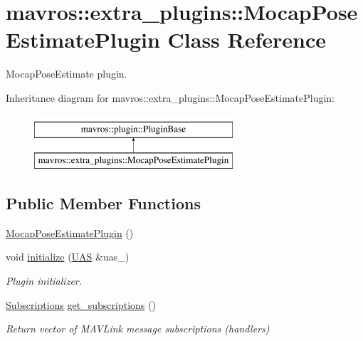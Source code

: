 \hypertarget{classmavros_1_1extra__plugins_1_1MocapPoseEstimatePlugin}{}\section{mavros\+::extra\+\_\+plugins\+::Mocap\+Pose\+Estimate\+Plugin Class Reference}
\label{classmavros_1_1extra__plugins_1_1MocapPoseEstimatePlugin}


Mocap\+Pose\+Estimate plugin.  


Inheritance diagram for mavros\+::extra\+\_\+plugins\+::Mocap\+Pose\+Estimate\+Plugin\+:\begin{figure}[H]
\begin{center}
\leavevmode
\includegraphics[height=2.000000cm]{classmavros_1_1extra__plugins_1_1MocapPoseEstimatePlugin}
\end{center}
\end{figure}
\subsection*{Public Member Functions}
\begin{DoxyCompactItemize}
\item 
\mbox{\hyperlink{group__plugin_ga94fe2e9a154d9513005c3e89dbdad680}{Mocap\+Pose\+Estimate\+Plugin}} ()
\item 
void \mbox{\hyperlink{group__plugin_ga28f24bffc57ef681f8c61dfbcc53478c}{initialize}} (\mbox{\hyperlink{classmavros_1_1UAS}{U\+AS}} \&uas\+\_\+)
\begin{DoxyCompactList}\small\item\em Plugin initializer. \end{DoxyCompactList}\item 
\mbox{\hyperlink{group__plugin_ga8967d61fc77040e0c3ea5a4585d62a09}{Subscriptions}} \mbox{\hyperlink{group__plugin_gad79e8a39bc49a479f78b9222cc7cc68a}{get\+\_\+subscriptions}} ()
\begin{DoxyCompactList}\small\item\em Return vector of M\+A\+V\+Link message subscriptions (handlers) \end{DoxyCompactList}\end{DoxyCompactItemize}
